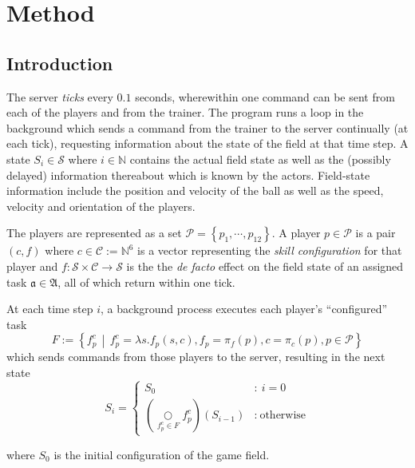 \documentclass[10pt,a4paper]{article}
\begin{document}
\section{Method}

\subsection{Introduction}
The server \textit{ticks} every \(0.1\) seconds, wherewithin one command can be sent from each of the players and from the trainer. The program runs a loop in the background which sends a command from the trainer to the server continually (at each tick), requesting information about the state of the field at that time step. A state \(S_i \in \mathcal{S}\) where \(i \in \mathbb{N}\) contains the actual field state as well as the (possibly delayed) information thereabout which is known by the actors. Field-state information include the position and velocity of the ball as well as the speed, velocity and orientation of the players.

The players are represented as a set \(\mathcal{P}=\left\{p_1,\cdots,p_{12}\right\}\). A player \(p \in \mathcal{P}\) is a pair \((c, f)\) where \(c \in \mathcal{C} := \mathbb{N}^6\) is a vector representing the \textit{skill configuration} for that player and \(f : \mathcal{S}\times \mathcal{C} \to \mathcal{S}\) is the the \textit{de facto} effect on the field state of an assigned task \(\mathfrak{a}\in\mathfrak{A}\), all of which return within one tick.

At each time step \(i\), a background process executes each player's ``configured'' task
\[
		F := \left\{ f_p^c \,\middle|\, f_p^c = \lambda s.f_p(s, c), f_p = \pi_f(p), c = \pi_c(p), p \in\mathcal{P} \right\}
\]
which sends commands from those players to the server, resulting in the next state 
\[
		S_{i} = \left\{
			\begin{array}{cl}
				S_0 & : \ i = 0 \\
					\left(\underset{f_p^c\in F}\bigcirc f_p^c\right)(S_{i-1}) & : \ \text{otherwise}
			\end{array}
		\right. %
\]

where \(S_0\) is the initial configuration of the game field.
\end{document}
